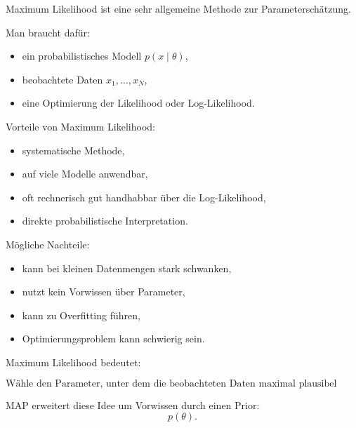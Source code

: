 \documentclass[11pt,a4paper]{scrartcl}
\begin{document}
\begin{notebox}
    Maximum Likelihood ist eine sehr allgemeine Methode zur Parameterschätzung.

    Man braucht dafür:

    \begin{itemize}
        \item ein probabilistisches Modell \(p(x \mid \theta)\),
        \item beobachtete Daten \(x_1,\dots,x_N\),
        \item eine Optimierung der Likelihood oder Log-Likelihood.
    \end{itemize}
\end{notebox}

\begin{solutionbox}
    Vorteile von Maximum Likelihood:

    \begin{itemize}
        \item systematische Methode,
        \item auf viele Modelle anwendbar,
        \item oft rechnerisch gut handhabbar über die Log-Likelihood,
        \item direkte probabilistische Interpretation.
    \end{itemize}

    Mögliche Nachteile:

    \begin{itemize}
        \item kann bei kleinen Datenmengen stark schwanken,
        \item nutzt kein Vorwissen über Parameter,
        \item kann zu Overfitting führen,
        \item Optimierungsproblem kann schwierig sein.
    \end{itemize}
\end{solutionbox}

\begin{answerbox}
    Maximum Likelihood bedeutet:

    \[
        \boxed{
            \text{Wähle den Parameter, unter dem die beobachteten Daten maximal plausibel sind.}
        }
    \]

    MAP erweitert diese Idee um Vorwissen durch einen Prior:
    \[
        \boxed{
            p(\theta).
        }
    \]
\end{answerbox}
\end{document}
